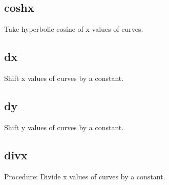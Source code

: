 \documentclass[letterpaper,10pt,english]{sphinxmanual}
\begin{document}
\subsection{coshx}
\label{\detokenize{math_operations:coshx}}
Take hyperbolic cosine of x values of curves.

\begin{sphinxVerbatim}[commandchars=\\\{\}]
\PYG{p}{[}\PYG{p}{]}  
\end{sphinxVerbatim}


\subsection{dx}
\label{\detokenize{math_operations:dx}}
Shift x values of curves by a constant.

\begin{sphinxVerbatim}[commandchars=\\\{\}]
\PYG{p}{[}\PYG{p}{]}   
\end{sphinxVerbatim}


\subsection{dy}
\label{\detokenize{math_operations:dy}}
Shift y values of curves by a constant.

\begin{sphinxVerbatim}[commandchars=\\\{\}]
\PYG{p}{[}\PYG{p}{]}   
\end{sphinxVerbatim}


\subsection{divx}
\label{\detokenize{math_operations:divx}}
Procedure: Divide x values of curves by a constant.

\begin{sphinxVerbatim}[commandchars=\\\{\}]
\PYG{p}{[}\PYG{p}{]}   
\end{sphinxVerbatim}
\end{document}
